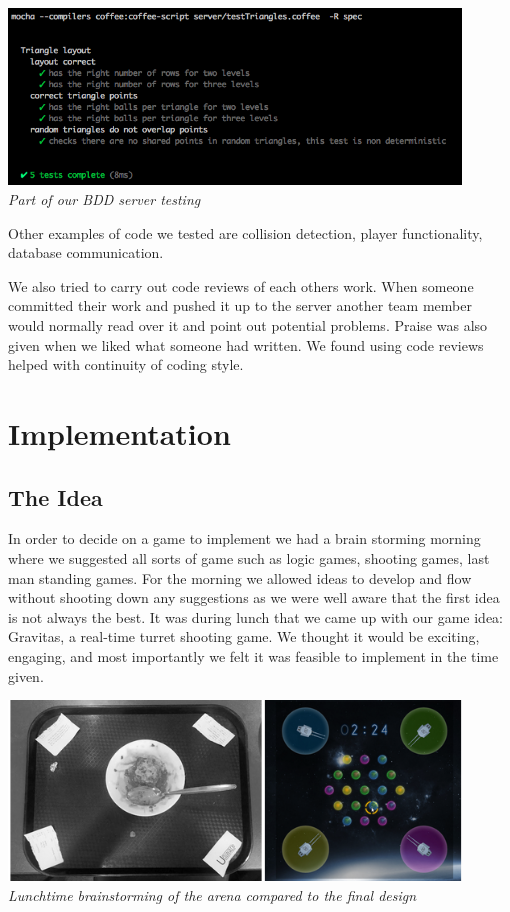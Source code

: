 \documentclass[a4wide, 11pt]{article}
\begin{document}
\begin{center}
    \includegraphics[width=0.9\textwidth]{images/test_run.png} \\
    \emph{Part of our BDD server testing}
\end{center}

Other examples of code we tested are collision detection, player functionality, database communication.

We also tried to carry out code reviews of each others work. When someone committed their work and pushed it up to the server another team member would normally read over it and point out potential problems. Praise was also given when we liked what someone had written. We found using code reviews helped with continuity of coding style. 

\section{Implementation}
\subsection{The Idea}
In order to decide on a game to implement we had a brain storming morning where we suggested all sorts of game such as logic games, shooting games, last man standing games. For the morning we allowed ideas to develop and flow without shooting down any suggestions as we were well aware that the first idea is not always the best. It was during lunch that we came up with our game idea: Gravitas, a real-time turret shooting game. We thought it would be exciting, engaging, and most importantly we felt it was feasible to implement in the time given.

\begin{center}

    \includegraphics[width=0.9\textwidth]{images/game_lunch.png} \\
  \emph{Lunchtime brainstorming of the arena compared to the final design}
\end{center}
\end{document}
